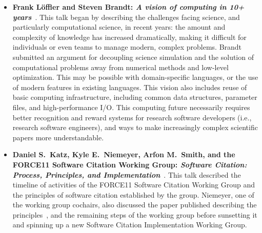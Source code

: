 \documentclass[11pt, oneside]{amsart}
\begin{document}
\begin{itemize}[itemsep=1ex]
    \item \textbf{Frank L\"{o}ffler and Steven Brandt\textsuperscript{\textasteriskcentered}:
    \emph{A vision of computing in 10+ years}}~\cite{Loffler:2016ws}.
    This talk began by describing the challenges facing science, and particularly
    computational science, in recent years: the amount and complexity of knowledge
    has increased dramatically, making it difficult for individuals or even teams to
    manage modern, complex problems.
    Brandt submitted an argument for decoupling science simulation and
    the solution of computational problems away from numerical methods and low-level
    optimization. This may be possible with domain-specific languages, or the use
    of modern features in existing languages. This vision also includes reuse of
    basic computing infrastructure, including common data structures, parameter files,
    and high-performance I\slash O. This computing future necessarily requires
    better recognition and reward systems for research software developers (i.e.,
    research software engineers), and ways to make increasingly complex scientific
    papers more understandable.


    \item \textbf{Daniel S.~Katz, Kyle E.~Niemeyer\textsuperscript{\textasteriskcentered},
    Arfon M.~Smith, and the FORCE11 Software Citation Working Group:
    \emph{Software Citation: Process, Principles, and Implementation}}~\cite{Katz:2016ws}.
    This talk described the timeline of activities of the FORCE11 Software Citation
    Working Group and the principles of software citation established by the group.
    Niemeyer, one of the working group cochairs, also discussed the paper published
    describing the principles~\cite{Smith:2016sc}, and the remaining steps of the
    working group before sunsetting it and spinning up a new Software Citation
    Implementation Working Group.


\end{itemize}
\end{document}
